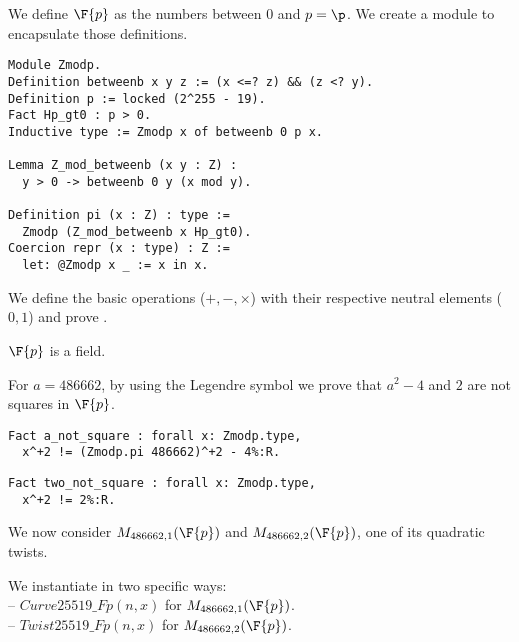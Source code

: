 We define $\F{p}$ as the numbers between $0$ and $p = \p$.
We create a  module to encapsulate those definitions.
\begin{lstlisting}[language=Coq]
Module Zmodp.
Definition betweenb x y z := (x <=? z) && (z <? y).
Definition p := locked (2^255 - 19).
Fact Hp_gt0 : p > 0.
Inductive type := Zmodp x of betweenb 0 p x.

Lemma Z_mod_betweenb (x y : Z) :
  y > 0 -> betweenb 0 y (x mod y).

Definition pi (x : Z) : type :=
  Zmodp (Z_mod_betweenb x Hp_gt0).
Coercion repr (x : type) : Z :=
  let: @Zmodp x _ := x in x.
\end{lstlisting}

We define the basic operations ($+, -, \times$) with their respective neutral
elements ($0, 1$) and prove .
\begin{lemma}
  \label{lemma:Zmodp_field}
  $\F{p}$ is a field.
\end{lemma}
For $a = 486662$, by using the Legendre symbol we prove that
$a^2 - 4$ and $2$ are not squares in $\F{p}$.
\begin{lstlisting}[language=Coq]
Fact a_not_square : forall x: Zmodp.type,
  x^+2 != (Zmodp.pi 486662)^+2 - 4%:R.
\end{lstlisting}
\begin{lstlisting}[language=Coq,label=two_not_square]
Fact two_not_square : forall x: Zmodp.type,
  x^+2 != 2%:R.
\end{lstlisting}
We now consider $M_{486662,1}(\F{p})$ and $M_{486662,2}(\F{p})$, one of its quadratic twists.
\begin{dfn}
We instantiate  in two specific ways:\\
-- $Curve25519\_Fp(n,x)$ for $M_{486662,1}(\F{p})$.\\
-- $Twist25519\_Fp(n,x)$ for $M_{486662,2}(\F{p})$.
\end{dfn}


